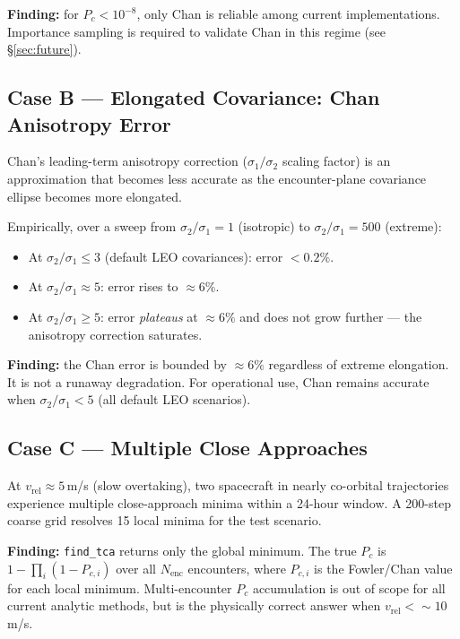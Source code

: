 \documentclass[11pt]{article}
\begin{document}
\textbf{Finding:} for $P_c < 10^{-8}$, only Chan is reliable among current
implementations.  Importance sampling is required to validate Chan in this
regime (see \S\ref{sec:future}).

\subsection{Case B — Elongated Covariance: Chan Anisotropy Error}

Chan's leading-term anisotropy correction ($\sigma_1/\sigma_2$ scaling factor)
is an approximation that becomes less accurate as the encounter-plane covariance
ellipse becomes more elongated.

Empirically, over a sweep from $\sigma_2/\sigma_1 = 1$ (isotropic) to
$\sigma_2/\sigma_1 = 500$ (extreme):
\begin{itemize}
  \item At $\sigma_2/\sigma_1 \le 3$ (default LEO covariances): error $<0.2\%$.
  \item At $\sigma_2/\sigma_1 \approx 5$: error rises to $\approx6\%$.
  \item At $\sigma_2/\sigma_1 \ge 5$: error \emph{plateaus} at $\approx6\%$ and
    does not grow further — the anisotropy correction saturates.
\end{itemize}

\textbf{Finding:} the Chan error is bounded by $\approx6\%$ regardless of
extreme elongation.  It is not a runaway degradation.  For operational use,
Chan remains accurate when $\sigma_2/\sigma_1 < 5$ (all default LEO scenarios).

\subsection{Case C — Multiple Close Approaches}

At $v_\text{rel} \approx 5$\,m/s (slow overtaking), two spacecraft in nearly
co-orbital trajectories experience multiple close-approach minima within a
24-hour window.  A 200-step coarse grid resolves 15 local minima for
the test scenario.

\textbf{Finding:} \texttt{find\_tca} returns only the global minimum.  The
true $P_c$ is $1 - \prod_i(1 - P_{c,i})$ over all $N_\text{enc}$ encounters,
where $P_{c,i}$ is the Fowler/Chan value for each local minimum.  Multi-encounter
$P_c$ accumulation is out of scope for all current analytic methods, but is the
physically correct answer when $v_\text{rel} < \sim10$\,m/s.
\end{document}
